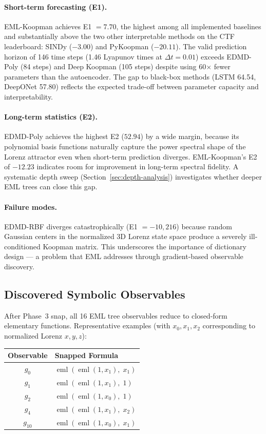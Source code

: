 \documentclass[11pt]{article}
\DeclareMathOperator{\eml}{eml}
\begin{document}
\paragraph{Short-term forecasting (E1).}
EML-Koopman achieves E1 $= 7.70$, the highest among all implemented baselines and
substantially above the two other interpretable methods on the CTF leaderboard:
SINDy ($-3.00$) and PyKoopman ($-20.11$).  The valid prediction horizon of 146
time steps (1.46 Lyapunov times at $\Delta t = 0.01$) exceeds EDMD-Poly (84 steps)
and Deep Koopman (105 steps) despite using 60$\times$ fewer parameters than the
autoencoder.  The gap to black-box methods (LSTM 64.54, DeepONet 57.80) reflects
the expected trade-off between parameter capacity and interpretability.

\paragraph{Long-term statistics (E2).}
EDMD-Poly achieves the highest E2 ($52.94$) by a wide margin, because its
polynomial basis functions naturally capture the power spectral shape of the
Lorenz attractor even when short-term prediction diverges.  EML-Koopman's E2
of $-12.23$ indicates room for improvement in long-term spectral fidelity.
A systematic depth sweep (Section~\ref{sec:depth-analysis}) investigates whether
deeper EML trees can close this gap.

\paragraph{Failure modes.}
EDMD-RBF diverges catastrophically (E1 $= -10{,}216$) because random Gaussian
centers in the normalized 3D Lorenz state space produce a severely ill-conditioned
Koopman matrix.  This underscores the importance of dictionary design --- a problem
that EML addresses through gradient-based observable discovery.

\subsection{Discovered Symbolic Observables}

After Phase~3 snap, all 16 EML tree observables reduce to closed-form
elementary functions.  Representative examples (with $x_0, x_1, x_2$
corresponding to normalized Lorenz $x, y, z$):

\begin{center}
\begin{tabular}{cl}
\toprule
Observable & Snapped Formula \\
\midrule
$g_0$ & $\eml(\eml(1, x_1),\; x_1)$ \\
$g_1$ & $\eml(\eml(1, x_1),\; 1)$ \\
$g_2$ & $\eml(\eml(1, x_0),\; 1)$ \\
$g_4$ & $\eml(\eml(1, x_1),\; x_2)$ \\
$g_{10}$ & $\eml(\eml(1, x_0),\; x_1)$ \\
\bottomrule
\end{tabular}
\end{center}
\end{document}
